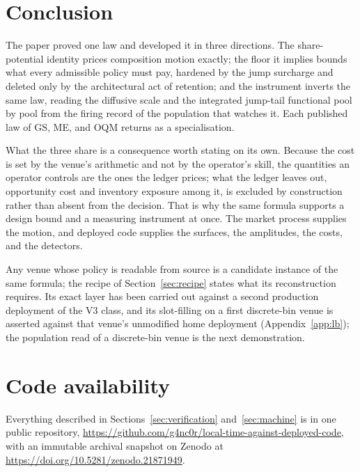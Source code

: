 \documentclass[11pt,a4paper]{article}
\theoremstyle{definition}
\theoremstyle{plain}
\theoremstyle{remark}
\begin{document}
\section{Conclusion}\label{sec:conclusion}

The paper proved one law and developed it in three directions. The share-potential identity prices composition motion exactly; the floor it implies bounds what every admissible policy must pay, hardened 
by the jump surcharge and deleted only by the architectural act of retention; and the instrument inverts the same law, reading the diffusive scale and the integrated jump-tail functional pool by pool 
from the firing record of the population that watches it. Each published law of GS, ME, and OQM returns as a specialisation.

What the three share is a consequence worth stating on its own. Because the cost is set by the venue's arithmetic and not by the operator's skill, the quantities an operator controls are the ones the 
ledger prices; what the ledger leaves out, opportunity cost and inventory exposure among it, is excluded by construction rather than absent from the decision. That is why the same formula supports a 
design bound and a measuring instrument at once. The market process supplies the motion, and deployed code supplies the surfaces, the amplitudes, the costs, and the detectors.

Any venue whose policy is readable from source is a candidate instance of the same formula; the recipe of Section~\ref{sec:recipe} states what its reconstruction requires. Its exact layer has been 
carried out against a second production deployment of the V3 class, and its slot-filling on a first discrete-bin venue is asserted against that venue's unmodified home deployment (Appendix~\ref{app:lb}); 
the population read of a discrete-bin venue is the next demonstration.

\section*{Code availability}

Everything described in Sections~\ref{sec:verification} and~\ref{sec:machine} is in one public repository, \url{https://github.com/g4nc0r/local-time-against-deployed-code}, with an immutable archival 
snapshot on Zenodo at \url{https://doi.org/10.5281/zenodo.21871949}.
\end{document}
